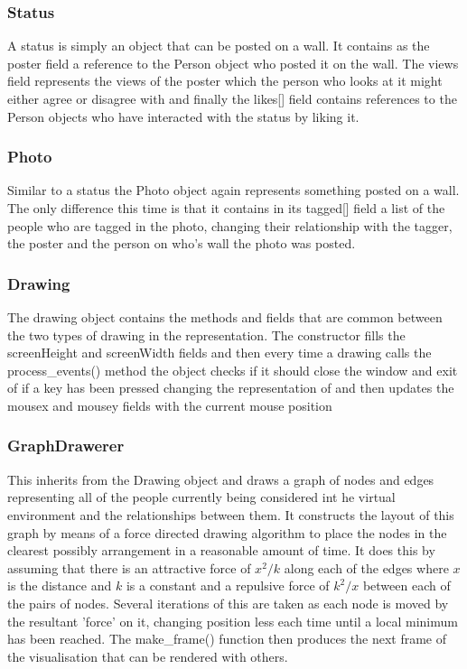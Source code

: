 \documentclass[12pt,a4paper]{article}
\begin{document}
\subsubsection{Status}
A status is simply an object that can be posted on a wall. It contains as the poster field a reference to the Person object who posted it on the wall. The views field 
represents the views of the poster which the person who looks at it might either agree or disagree with and finally the likes[] field contains references to the Person objects who have interacted with the status by liking it.

\subsubsection{Photo}
Similar to a status the Photo object again represents something posted on a wall. The only difference this time is that it contains in its tagged[] field a list of the people who are tagged in the photo, changing their relationship with the tagger, the poster and the person on who's wall the photo was posted.

\subsubsection{Drawing}
The drawing object contains the methods and fields that are common between the two types of drawing in the representation. The constructor fills the screenHeight and screenWidth fields and then every time a drawing calls the process\_events() method the object checks if it should close the window and exit of if a key has been pressed changing the representation of and then updates the mousex and mousey fields with the current mouse position

\subsubsection{GraphDrawerer}
This inherits from the Drawing object and draws a graph of nodes and edges representing all of the people currently being considered int he virtual environment and the relationships between them. It constructs the layout of this graph by means of a force directed drawing algorithm to place the nodes in the clearest possibly arrangement in a reasonable amount of time. It does this by assuming that there is an attractive force of $x^2/k$ along each of the edges where $x$ is the distance and $k$ is a constant and a repulsive force of $k^2/x$ between each of the pairs of nodes. Several iterations of this are taken as each node is moved by the resultant 'force' on it, changing position less each time until a local minimum has been reached. The make\_frame() function then produces the next frame of the visualisation that can be rendered with others.
\end{document}
